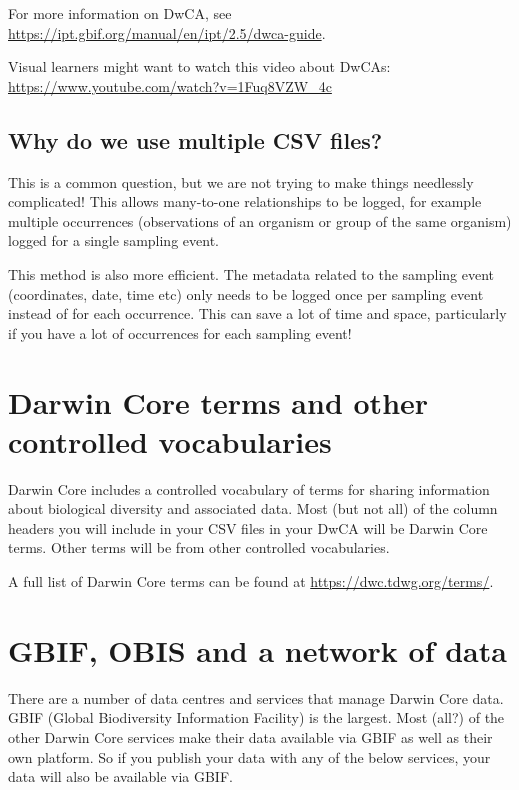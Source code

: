 \documentclass[a4paper,english, 11pt]{article}
\begin{document}
For more information on DwCA, see \url{https://ipt.gbif.org/manual/en/ipt/2.5/dwca-guide}.

Visual learners might want to watch this video about DwCAs: \url{https://www.youtube.com/watch?v=1Fuq8VZW_4c}


\subsection{Why do we use multiple CSV files?}
\label{ss:multiplefiles}

This is a common question, but we are not trying to make things needlessly complicated! This allows many-to-one relationships to be logged, for example multiple occurrences (observations of an organism or group of the same organism) logged for a single sampling event.

This method is also more efficient. The metadata related to the sampling event (coordinates, date, time etc) only needs to be logged once per sampling event instead of for each occurrence. This can save a lot of time and space, particularly if you have a lot of occurrences for each sampling event!

\section{Darwin Core terms and other controlled vocabularies}
\label{s:dwcterms}

Darwin Core includes a controlled vocabulary of terms for sharing information about biological diversity and associated data. Most (but not all) of the column headers you will include in your CSV files in your DwCA will be Darwin Core terms. Other terms will be from other controlled vocabularies.

A full list of Darwin Core terms can be found at \url{https://dwc.tdwg.org/terms/}.

\section{GBIF, OBIS and a network of data}
\label{s:gbif}

There are a number of data centres and services that manage Darwin Core data. GBIF (Global Biodiversity Information Facility) is the largest. Most (all?) of the other Darwin Core services make their data available via GBIF as well as their own platform. So if you publish your data with any of the below services, your data will also be available via GBIF.
\end{document}
